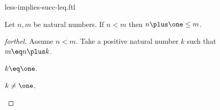 \documentclass{stex}
\begin{document}
\begin{smodule}{less-implies-succ-leq.ftl}


\begin{proposition}[forthel,id=LessImpliesSuccLeqProp]
  Let $n, m$ be natural numbers.
  If $n \less m$ then $n \plus \one \leq m$.
\end{proposition}
\begin{proof}[forthel]
  Assume $n \less m$.
  Take a positive natural number $k$ such that $m \eq n \plus k$.

  \begin{case}{$k \eq \one$.} \end{case}

  \begin{case}{$k \neq \one$.} \end{case}
\end{proof}

\end{smodule}
\end{document}

